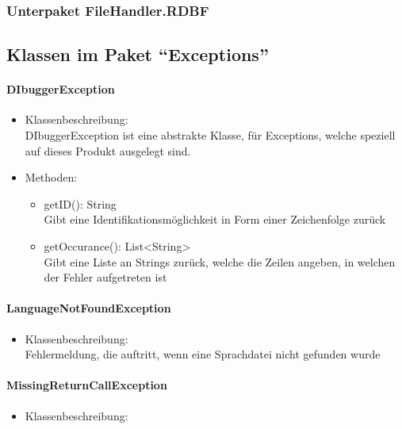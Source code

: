 \documentclass[parskip=full]{scrartcl}
\begin{document}
\subsubsection{Unterpaket FileHandler.RDBF}

\subsection{Klassen im Paket \enquote{Exceptions}} 
\paragraph{DIbuggerException}
\begin{itemize}
\item Klassenbeschreibung: \\
DIbuggerException ist eine abstrakte Klasse, für Exceptions, welche speziell auf dieses Produkt ausgelegt sind.
\item Methoden: \\
\begin{itemize}
\item getID(): String \\
Gibt eine Identifikationsmöglichkeit in Form einer Zeichenfolge zurück
\item getOccurance(): List<String> \\
Gibt eine Liste an Strings zurück, welche die Zeilen angeben, in welchen der Fehler aufgetreten ist
\end{itemize}
\end{itemize}

\paragraph{LanguageNotFoundException}
\begin{itemize}
\item Klassenbeschreibung: \\
Fehlermeldung, die auftritt, wenn eine Sprachdatei nicht gefunden wurde
\end{itemize}

\paragraph{MissingReturnCallException}
\begin{itemize}
\item Klassenbeschreibung: \\
\end{itemize}
\end{document}
